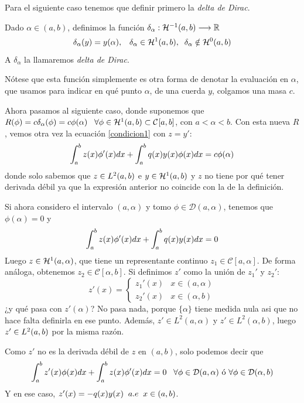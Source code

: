 Para el siguiente caso tenemos que definir primero la \textit{delta de Dirac}.

\medskip

\begin{definition}
Dado $\alpha\in(a,b)$, definimos la función $\funcion{\delta_\alpha}{\sobolev{-1}}{\R}$
\[
\delta_\alpha(y)=y(\alpha), \espacio \delta_\alpha\in\sobolev{1}, \;\; \delta_\alpha\notin\sobolev{0}
\]
A $\delta_\alpha$ la llamaremos \textit{delta de Dirac}.
\end{definition}
\begin{remark}
Nótese que esta función simplemente es otra forma de denotar la evaluación en $\alpha$, que usamos para indicar en qué punto $\alpha$, de una cuerda $y$, colgamos una masa $c$. 
\end{remark}

Ahora pasamos al siguiente caso, donde suponemos que $R(\phi)=c\delta_\alpha(\phi)=c\phi(\alpha) \espacio \forall \phi\in\sobolev{1}\subset\continuas$, con $a<\alpha<b$. Con esta nueva $R$, vemos otra vez la ecuación \ref{condicion1} con $z=y'$:
\[
\integral{a}{b}{z(x)\phi'(x)dx}+\integral{a}{b}{q(x)y(x)\phi(x)dx}=c\phi(\alpha)
\]
donde solo sabemos que $z\in\lebesgue{2}$ e $y\in\sobolev{1}$ y $z$ no tiene por qué tener derivada débil ya que la expresión anterior no coincide con la de la definición. 

Si ahora considero el intervalo $(a,\alpha)$ y tomo $\phi\in\mathcal{D}(a,\alpha)$, tenemos que $\phi(\alpha)=0$ y
\[
\integral{a}{b}{z(x)\phi'(x)dx}+\integral{a}{b}{q(x)y(x)dx}=0
\]
Luego $z\in\sobolev[a,\alpha]{1}$, que tiene un representante continuo $z_1\in\mathcal{C}[a,\alpha]$. De forma análoga, obtenemos $z_2\in\mathcal{C}[\alpha,b]$. Si definimos $z'$ como la unión de $z_1'$ y $z_2'$:
\[
z'(x)= \left\{
\begin{array}{cc}
z_1'(x) & x\in(a,\alpha) \\
z_2'(x) & x\in(\alpha,b)
\end{array}
\right.
\]
¿y qué pasa con $z'(\alpha)$? No pasa nada, porque $\{\alpha\}$ tiene medida nula asi que no hace falta definirla en ese punto. Además, $z'\in L^2(a,\alpha)$ y $z'\in L^2(\alpha,b)$, luego $z'\in\lebesgue{2}$ por la misma razón. 

Como $z'$ no es la derivada débil de $z$ en $(a,b)$, solo podemos decir que
\[
\integral{a}{b}{z'(x)\phi(x)dx}+\integral{a}{b}{z(x)\phi'(x)dx}=0 \espacio \forall \phi\in\mathcal{D}(a,\alpha) \text{ ó } \forall \phi\in\mathcal{D}(\alpha,b)
\]
Y en ese caso, $z'(x)=-q(x)y(x) \;\; \casipordoquier$. 

